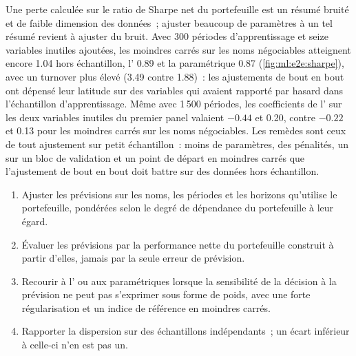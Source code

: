 Une perte calculée sur le ratio de Sharpe net du portefeuille est un résumé bruité et de faible dimension des données~; ajuster beaucoup de paramètres à
un tel résumé revient à ajuster du bruit. Avec 300 périodes d'apprentissage et seize variables inutiles ajoutées, les moindres carrés sur les noms négociables
atteignent encore 1.04 hors échantillon, l' 0.89 et la  paramétrique 0.87 (\cref{fig:ml:e2e:sharpe}),
avec un turnover plus élevé (3.49 contre 1.88)~: les ajustements de bout en bout ont dépensé leur latitude sur des variables qui avaient rapporté par hasard dans
l'échantillon d'apprentissage. Même avec 1\,500 périodes, les coefficients de l' sur les deux variables inutiles du
premier panel valaient $-0.44$ et 0.20, contre $-0.22$ et 0.13 pour les moindres carrés sur les noms négociables. Les remèdes sont ceux de tout ajustement
sur petit échantillon~: moins de paramètres, des pénalités, un  sur un bloc de validation et un point de départ en moindres carrés que
l'ajustement de bout en bout doit battre sur des données hors échantillon.

\begin{method}\label{met:ml:e2e:method}
\begin{enumerate}
\item Ajuster les prévisions sur les noms, les périodes et les horizons qu'utilise le portefeuille, pondérées selon le degré de dépendance du portefeuille à leur égard.
\item Évaluer les prévisions par la performance nette du portefeuille construit à partir d'elles, jamais par la seule erreur de prévision.
\item Recourir à l' ou aux  paramétriques lorsque la sensibilité de la décision à la prévision ne peut pas s'exprimer
sous forme de poids, avec une forte régularisation et un indice de référence en moindres carrés.
\item Rapporter la dispersion sur des échantillons indépendants~; un écart inférieur à celle-ci n'en est pas un.
\end{enumerate}
\end{method}

